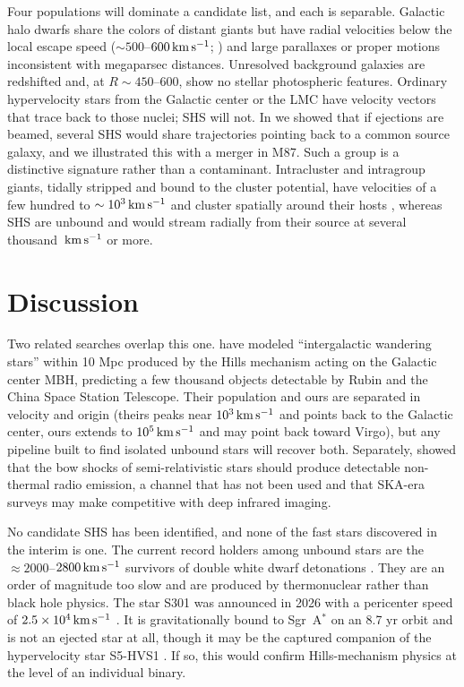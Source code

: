 \documentclass[twocolumn]{aastex701}
\newcommand{\kms}{\,{\rm km\,s^{-1}}}
\begin{document}
Four populations will dominate a candidate list, and each is separable.
Galactic halo dwarfs share the colors of distant giants but have radial
velocities below the local escape speed ($\sim500$--$600\kms$;
\citealt{piffl14}) and large parallaxes or proper motions inconsistent
with megaparsec distances. Unresolved background galaxies are redshifted and, at
$R\sim450$--$600$, show no stellar photospheric features. Ordinary hypervelocity
stars from the Galactic center or the LMC \citep{brown15,han25} have velocity
vectors that trace back to those nuclei; SHS will not. In
 we showed that if ejections are beamed, several SHS would
share trajectories pointing back to a common source galaxy, and we illustrated this
with a merger in M87. Such a group is a distinctive signature rather than a
contaminant.
Intracluster and intragroup giants, tidally stripped and bound to the cluster
potential, have velocities of a few hundred to $\sim10^{3}\kms$ and cluster
spatially around their hosts \citep{longobardi15}, whereas SHS are unbound and
would stream radially from their source at several thousand $\kms$ or more.

\section{Discussion}
\label{sec:disc}

Two related searches overlap this one. \citet{wang25} have
modeled ``intergalactic wandering stars'' within 10 Mpc produced by the Hills
mechanism acting on the Galactic center MBH, predicting a few thousand objects
detectable by Rubin and the China Space Station Telescope. Their population and
ours are separated in velocity and origin (theirs peaks near
$10^{3}\kms$ and points back to the Galactic center, ours extends to
$10^{5}\kms$ and may point back toward Virgo), but any pipeline built to find
isolated unbound stars will recover both. Separately, \citet{martinez22} showed that the bow shocks of
semi-relativistic stars should produce detectable non-thermal radio emission, a
channel that has not been used and that SKA-era surveys may make
competitive with deep infrared imaging.

No
candidate SHS has been identified, and none of the fast stars discovered in the
interim is one. The current record holders among unbound stars are the
$\approx2000$--$2800\kms$ survivors of double white dwarf detonations
\citep{elbadry23,pakmor26}. They are an order of magnitude too slow and are
produced by thermonuclear rather than black hole physics. The star S301 was
announced in 2026 with a pericenter speed of $2.5\times10^{4}\kms$
\citep{gravity26}. It is gravitationally bound to Sgr~A$^{*}$ on an 8.7 yr orbit and is not an ejected
star at all, though it may be the captured companion of the hypervelocity star
S5-HVS1 \citep{caputo26}. If so, this would confirm Hills-mechanism physics at
the level of an individual binary.
\end{document}
